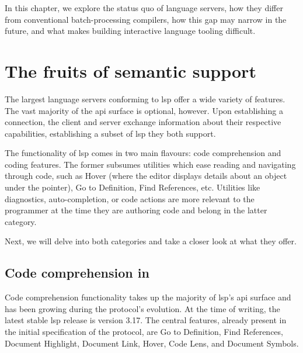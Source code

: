 In this chapter, we explore the status quo of language servers, how they differ
from conventional batch-processing compilers, how this gap may narrow in the
future, and what makes building interactive language tooling difficult.

\section{The fruits of semantic support}

The largest language servers conforming to \acrshort{lsp} offer a wide variety
of features. The vast majority of the \acrshort{api} surface is optional,
however. Upon establishing a connection, the client and server exchange
information about their respective capabilities, establishing a subset of
\acrshort{lsp} they both support.

The functionality of \acrshort{lsp} comes in two main flavours: code
comprehension and coding features. The former subsumes utilities which ease
reading and navigating through code, such as Hover (where the editor displays
details about an object under the pointer), Go to Definition, Find References,
etc. Utilities like diagnostics, auto-completion, or code actions are more
relevant to the programmer at the time they are authoring code and belong in the
latter category.

Next, we will delve into both categories and take a closer look at what they
offer.


\subsection{Code comprehension in }

\newcommand{\org}{\pdftooltip{(original)}{This request was present in the
original LSP specification.}}

Code comprehension functionality takes up the majority of \acrshort{lsp}'s
\acrshort{api} surface and has been growing during the protocol's evolution. At
the time of writing, the latest stable \acrshort{lsp} release is version 3.17.
The central features, already present in the initial specification of the
protocol, are Go to Definition, Find References, Document Highlight, Document
Link, Hover, Code Lens, and Document Symbols.

